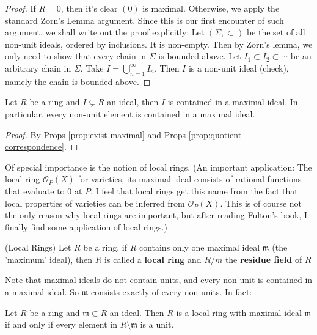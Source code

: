 \documentclass{note-eng}
\begin{document}
\begin{proof}
    If $R = 0$, then it's clear $(0)$ is maximal. Otherwise, we apply the standard Zorn's Lemma argument. Since this is our first encounter of such argument, we shall write out the proof explicitly: Let $(\Sigma, \subset)$ be the set of all non-unit ideals, ordered by inclusions. It is non-empty. Then by Zorn's lemma, we only need to show that every chain in $\Sigma$ is bounded above. Let $I_1 \subset I_2 \subset \cdots$ be an arbitrary chain in $\Sigma$. Take $I = \bigcup\limits_{n = 1}^{\infty} I_n$. Then $I$ is a non-unit ideal (check), namely the chain is bounded above.
\end{proof}

\begin{corollary}
    Let $R$ be a ring and $I \subsetneq R$ an ideal, then $I$ is contained in a maximal ideal. In particular, every non-unit element is contained in a maximal ideal.
\end{corollary}

\begin{proof}
    By Props \ref{prop:exist-maximal} and Props \ref{prop:quotient-correspondence}.
\end{proof}

\iffalse

Of special importance is the notion of local rings. (An important application: The local ring $\mathcal{O}_{P}(X)$ for varieties, its maximal ideal consists of rational functions that evaluate to $0$ at $P$. I feel that local rings get this name from the fact that local properties of varieties can be inferred from $\mathcal{O}_{P}(X)$. This is of course not the only reason why local rings are important, but after reading Fulton's book, I finally find some application of local rings.)

\begin{definition}
    (Local Rings) Let $R$ be a ring, if $R$ contains only one maximal ideal $\mathfrak{m}$ (the 'maximum' ideal), then $R$ is called a \textbf{local ring} and $R / m$ the \textbf{residue field} of $R$
\end{definition}

Note that maximal ideals do not contain units, and every non-unit is contained in a maximal ideal. So $\mathfrak{m}$ consists exactly of every non-units. In fact:

\begin{proposition}
    Let $R$ be a ring and $\mathfrak{m} \subset R$ an ideal. Then $R$ is a local ring with maximal ideal $\mathfrak{m}$ if and only if every element in $R \setminus \mathfrak{m}$ is a unit.
\end{proposition}
\end{document}
